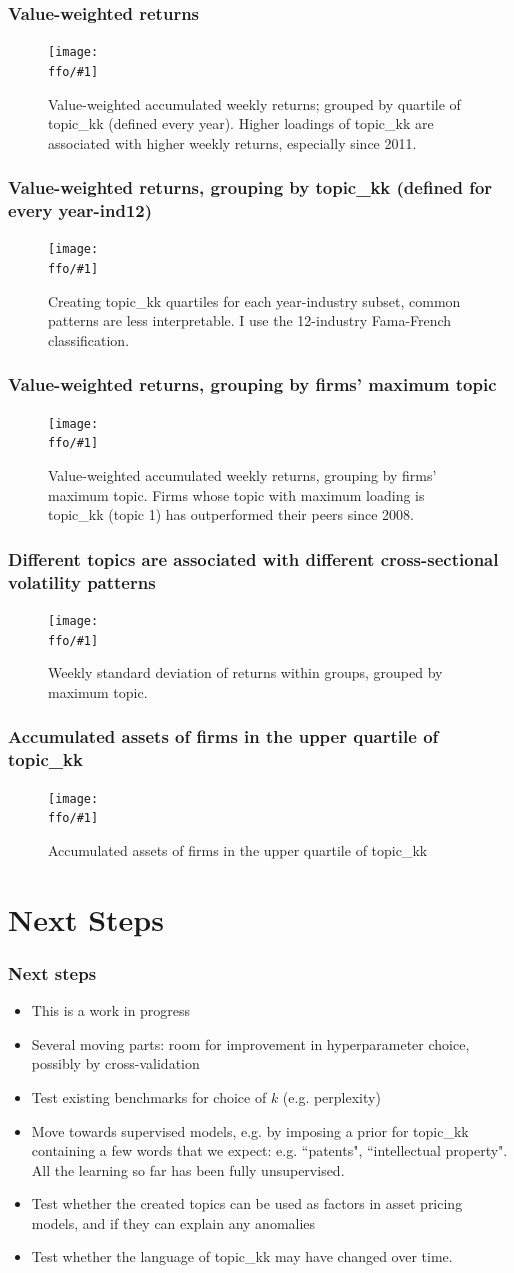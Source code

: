 \documentclass{beamer}
\newcommand{\ffo}{dicfullmc10thr10defnob5noa0_8_4t}
\newcommand{\insertfigure}[2]{
\begin{figure}[h!]
  \centering
  \texttt{[image: \\ffo/\#1]}
  \centering
  \captionsetup{font=scriptsize}
  \caption{#2}
  \label{fig:#1}
\end{figure}
}
\begin{document}
\begin{frame}
\frametitle{Value-weighted returns}
\insertfigure{awawr}{Value-weighted accumulated weekly returns; grouped by quartile of topic\_kk (defined every year). Higher loadings of topic\_kk are associated with higher weekly returns, especially since 2011. }
\end{frame}



\begin{frame}
\frametitle{Value-weighted returns, grouping by topic\_kk (defined for every year-ind12)}
\insertfigure{awawr_aggind}{Creating topic\_kk quartiles for each year-industry subset, common patterns are less interpretable. I use the 12-industry Fama-French classification.}
\end{frame}

\begin{frame}
\frametitle{Value-weighted returns, grouping by firms' maximum topic}
\insertfigure{awawr_byg}{Value-weighted accumulated weekly returns, grouping by firms' maximum topic. Firms whose topic with maximum loading is topic\_kk (topic 1) has outperformed their peers since 2008.}
\end{frame}

\begin{frame}
\frametitle{Different topics are associated with different cross-sectional volatility patterns}
\insertfigure{wsdr_byg}{Weekly standard deviation of returns within groups, grouped by maximum topic.}
\end{frame}

\begin{frame}
\frametitle{Accumulated assets of firms in the upper quartile of topic\_kk}
\insertfigure{stackedplot_at}{Accumulated assets of firms in the upper quartile of topic\_kk}
\end{frame}



\section{Next Steps}

\begin{frame}
\frametitle{Next steps}
\begin{itemize}
\item This is a work in progress
\item Several moving parts: room for improvement in hyperparameter choice, possibly by cross-validation
\item Test existing benchmarks for choice of $k$ (e.g. perplexity)
\item Move towards supervised models, e.g. by imposing a prior for topic\_kk containing a few words that we expect: e.g. ``patents", ``intellectual property". All the learning so far has been fully unsupervised. 
\item Test whether the created topics can be used as factors in asset pricing models, and if they can explain any anomalies
\item Test whether the language of topic\_kk may have changed over time.
\end{itemize}
\end{frame}
\end{document}
